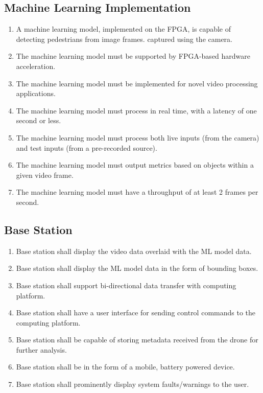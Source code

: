 \documentclass[10pt,letterpaper]{article}
\begin{document}
\subsection{Machine Learning Implementation}
\begin{enumerate}[label=F.ML.\arabic*, wide=1cm, widest=3cm, leftmargin=*, font=\bfseries, noitemsep,topsep=0pt, parsep=4pt, partopsep=0pt]
	\item A machine learning model, implemented on the FPGA, is capable of detecting pedestrians from image frames. captured using the camera.
	\item The machine learning model must be supported by FPGA-based hardware acceleration.
	\item The machine learning model must be implemented for novel video processing applications.
	\item The machine learning model must process in real time, with a latency of one second or less.
	\item The machine learning model must process both live inputs (from the camera) and test inputs (from a pre-recorded source). 
	\item The machine learning model must output metrics based on objects within a given video frame.
	\item The machine learning model must have a throughput of at least 2 frames per second.
\end{enumerate}



\subsection{Base Station}
\begin{enumerate}[label=F.BS.\arabic*, wide=1cm, widest=3cm, leftmargin=*, font=\bfseries, noitemsep,topsep=0pt, parsep=4pt, partopsep=0pt]
    \item Base station shall display the video data overlaid with the ML model data.
	\item Base station shall display the ML model data in the form of bounding boxes.
	\item Base station shall support bi-directional data transfer with computing platform.
	\item Base station shall have a user interface for sending control commands to the computing platform.
    \item Base station shall be capable of storing metadata received from the drone for further analysis.
    \item Base station shall be in the form of a mobile, battery powered device.
    \item Base station shall prominently display system faults/warnings to the user.
\end{enumerate}
\end{document}
